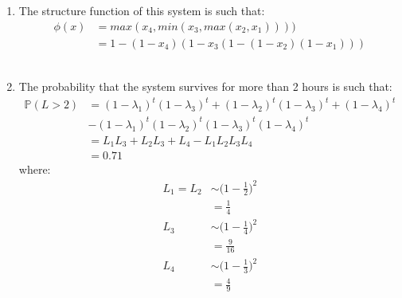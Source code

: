 \documentclass{article}
\begin{document}
\begin{enumerate}
    \begin{enumerate}
        \item The structure function of this system is such that:
        \begin{equation}
            \begin{split}
                \phi(x) &= max(x_4, min(x_3, max(x_2, x_1))))\\
                &= 1 - (1-x_4) (1-x_3(1-(1-x_2)(1-x_1)))
            \end{split}
        \end{equation}\\
        \item The probability that the system survives for more than 2 hours is such that:
        \begin{equation}
            \begin{split}
                \mathbb{P}{(L>2)} &= (1-\lambda_1)^{t} (1-\lambda_3)^{t} + (1-\lambda_2)^{t} (1-\lambda_3)^{t} + (1-\lambda_4)^{t}\\
                & - (1-\lambda_1)^{t} (1-\lambda_2)^{t} (1-\lambda_3)^{t} (1-\lambda_4)^{t}\\
                &= L_1L_3 + L_2L_3 + L_4 - L_1L_2L_3L_4\\
                &= 0.71
            \end{split}
        \end{equation}
        where:
        \begin{equation}
            \begin{split}
                L_1 = L_2 &\sim \Big(1 - \frac{1}{2}\Big)^2\\
                &= \frac{1}{4}\\
                L_3 &\sim \Big(1 - \frac{1}{4}\Big)^2\\
                &= \frac{9}{16}\\
                L_4 &\sim \Big(1 - \frac{1}{3}\Big)^2\\
                &= \frac{4}{9}\\
            \end{split}
        \end{equation}\\
        

\end{enumerate}
\end{enumerate}
\end{document}
